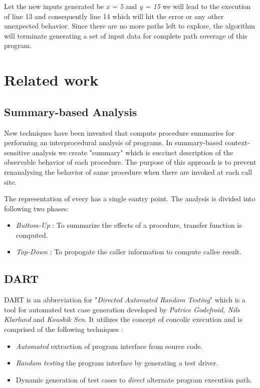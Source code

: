 \documentclass[12pt,oneside]{book}
\begin{document}
Let the new inputs generated be \textit{x = 5} and \textit{y = 15} we will lead to the execution of line 13 and consequently line 14 which will hit the error or any other unexpected behavior. Since there are no more paths left to explore, the algorithm will terminate generating a set of input data for complete path coverage of this program.


\section {Related work}


\subsection {Summary-based Analysis}
New techniques have been invented that compute procedure summaries for performing an interprocedural analysis of programs. In summary-based context-sensitive analysis we create "summary" which is succinct description of the observable behavior of each procedure. The purpose of this approach is to prevent renanalysing the behavior of same procedure when there are invoked at each call site.

The representation of every has a single eantry point. The analysis is divided into following two phases:
\begin{itemize}
  \item \textit{Buttom-Up} : To summarize the effects of a procedure, transfer function is computed.
  \item \textit{Top-Down} : To propogate the caller information to compute callee result.
\end{itemize}


\subsection {DART}
DART is an abbreviation for "\textit{Directed Automated Random Testing}" which is a tool for automated test case generation developed by \textit{Patrice Godefroid, Nils Klarlund} and \textit{Koushik Sen}. It utilizes the concept of concolic execution and is comprised of the following techniques :
\begin{itemize}
 \item \textit{Automated} extraction of program interface from source code.
 \item \textit{Random testing} the program interface by generating a test driver. 
 \item Dynamic generation of test cases to \textit{direct} alternate program execution path.
\end{itemize}
\end{document}
